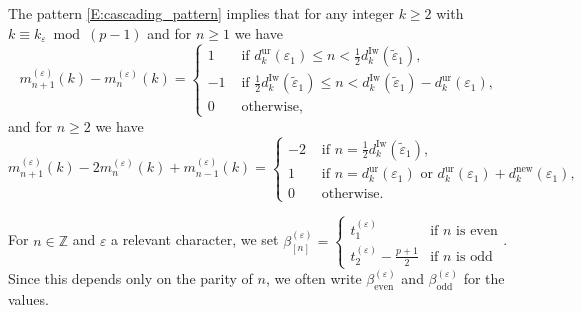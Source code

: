 \begin{remark}
    \label{E:increment_of_multiplicity}
    The pattern \eqref{E:cascading_pattern} implies that for any integer $k \geq 2$ with $k \equiv k_\varepsilon \bmod {(p-1)}$ and for $n\geq 1$ we have
    \begin{equation}
    m_{n+1}^{(\varepsilon)}(k) -m_{n}^{(\varepsilon)}(k) =
    \begin{cases}
    1 & \textrm{ if }  d_{k}^{\mathrm{ur}}(\varepsilon_1)  \leq n< \frac 12 d_{k}^{\mathrm{Iw}}(\tilde \varepsilon_1),\\
    -1 & \textrm{ if }\frac 12 d_{k}^{\mathrm{Iw}}(\tilde \varepsilon_1) \leq n < d_{k}^{\mathrm{Iw}}(\tilde \varepsilon_1) - d_{k}^{\mathrm{ur}}(\varepsilon_1),\\
    0 & \textrm{ otherwise,}
    \end{cases}
    \end{equation}
    and for $n \geq 2$ we have
    \begin{equation}\label{E:second_order_increment_of_multiplicity}
    m_{n+1}^{(\varepsilon)}(k) -2m_n^{(\varepsilon)}(k) +m_{n-1}^{(\varepsilon)}(k) =
    \begin{cases}
    -2 & \textrm{ if }  n = \frac 12 d_{k}^{\mathrm{Iw}}(\tilde \varepsilon_1),\\
    1 & \textrm{ if }n =  d_{k}^{\mathrm{ur}}(\varepsilon_1) \textrm{ or } d_{k}^{\mathrm{ur}}(\varepsilon_1)+d_{k}^{{\mathrm{new}}}(\varepsilon_1),\\
    0 & \textrm{ otherwise.}
    \end{cases}
    \end{equation}
\end{remark}

\begin{notation}
    \label{N:tnvarepsilon}
    For $n \in {\mathbb{Z}}$ and $\varepsilon$ a relevant character, we set
    $\beta_{[n]}^{(\varepsilon)} = \begin{cases}
    t_1^{(\varepsilon)} & \textrm{if }n \textrm{ is even}
    \\
    t_2^{(\varepsilon)}-
    \tfrac{p+1}2 & \textrm{if }n \textrm{ is odd}
    \end{cases}$.
    Since this depends only on the parity of $n$, we often write $\beta_{\mathrm{even}}^{(\varepsilon)}$ and $\beta_{\mathrm{odd}}^{(\varepsilon)}$ for the values.
\end{notation}

